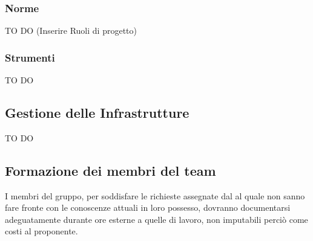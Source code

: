 		\subsubsection{Norme}
TO DO (Inserire Ruoli di progetto)	
		\subsubsection{Strumenti}
TO DO
		
	\subsection{Gestione delle Infrastrutture}
TO DO


	\subsection{Formazione dei membri del team}
I membri del gruppo, per soddisfare le richieste assegnate dal \roleProjectManager{} al quale non sanno fare fronte con le conoscenze attuali in loro possesso, dovranno documentarsi adeguatamente durante ore esterne a quelle di lavoro, non imputabili perciò come costi al proponente.